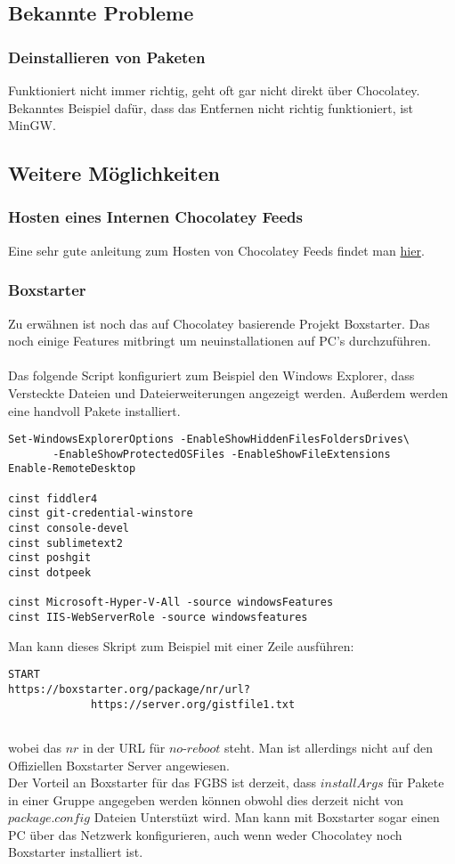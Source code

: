 \documentclass[10pt,a4paper]{article}
\begin{document}
\subsection{Bekannte Probleme}
\subsubsection{Deinstallieren von Paketen}
Funktioniert nicht immer richtig, geht oft gar nicht direkt über Chocolatey. Bekanntes Beispiel dafür, dass das Entfernen nicht richtig funktioniert, ist MinGW.

\subsection{Weitere Möglichkeiten}
\subsubsection{Hosten eines Internen Chocolatey Feeds}
Eine sehr gute anleitung zum Hosten von Chocolatey Feeds findet man \href{https://github.com/chocolatey/choco/wiki/How-To-Host-Feed}{hier}.

\subsubsection{Boxstarter}
Zu erwähnen ist noch das auf Chocolatey basierende Projekt Boxstarter. Das noch einige Features mitbringt um neuinstallationen auf PC's durchzuführen.\\\\

Das folgende Script konfiguriert zum Beispiel den Windows Explorer, dass Versteckte Dateien und Dateierweiterungen angezeigt werden. Außerdem werden eine handvoll Pakete installiert.

\begin{lstlisting}
Set-WindowsExplorerOptions -EnableShowHiddenFilesFoldersDrives\
       -EnableShowProtectedOSFiles -EnableShowFileExtensions
Enable-RemoteDesktop

cinst fiddler4
cinst git-credential-winstore
cinst console-devel
cinst sublimetext2
cinst poshgit
cinst dotpeek

cinst Microsoft-Hyper-V-All -source windowsFeatures
cinst IIS-WebServerRole -source windowsfeatures
\end{lstlisting}

Man kann dieses Skript zum Beispiel mit einer Zeile ausführen:
\begin{lstlisting} 
START 
https://boxstarter.org/package/nr/url?
             https://server.org/gistfile1.txt 
      
\end{lstlisting}
wobei das $nr$ in der URL für $no$-$reboot$ steht. Man ist allerdings nicht auf den Offiziellen Boxstarter Server angewiesen.
\\
Der Vorteil an Boxstarter für das FGBS ist derzeit, dass $installArgs$ für Pakete in einer Gruppe angegeben werden können obwohl dies derzeit nicht von $package.config$ Dateien Unterstüzt wird.
Man kann mit Boxstarter sogar einen PC über das Netzwerk konfigurieren, auch wenn weder Chocolatey noch Boxstarter installiert ist.




\renewcommand{\indexname}{Stichworte}  %
\printindex                            %
\end{document}
